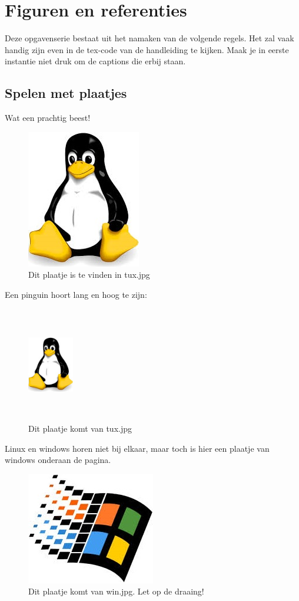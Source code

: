 \documentclass{article}
\begin{document}
\section{Figuren en referenties}
Deze opgavenserie bestaat uit het namaken van de volgende regels. Het zal vaak handig zijn even in de tex-code van de handleiding te kijken. Maak je in eerste instantie niet druk om de captions die erbij staan.
\subsection{Spelen met plaatjes}
\label{sec:Plaatjes}
Wat een prachtig beest! 
\begin{figure}[h]
\includegraphics[scale = 0.5]{tux.jpg}
\caption{Dit plaatje is te vinden in tux.jpg}
\label{fig:Giraffe}
\end{figure}
Een pinguin hoort lang en hoog te zijn:
\begin{figure}[h!]
\includegraphics[height = 5cm, width = 2cm]{tux.jpg}
\caption{Dit plaatje komt van tux.jpg}
\label{fig:Lang}
\end{figure}
Linux en windows horen niet bij elkaar, maar toch is hier een plaatje van windows onderaan de pagina. \\
\begin{figure}[b!]
\includegraphics[scale = 0.3, angle = 150]{win.jpg}
\caption{Dit plaatje komt van win.jpg. Let op de draaing!}
\label{fig:asbak}
\end{figure}
\newpage
\end{document}
